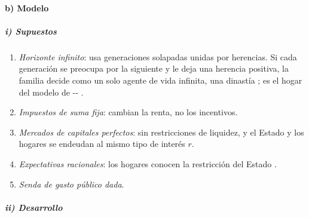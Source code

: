 \documentclass[11pt]{article}
\begin{document}
\paragraph{b) Modelo}

\subparagraph{i) Supuestos}

\begin{enumerate}
\item \emph{Horizonte infinito}:  usa generaciones solapadas unidas por herencias. Si cada generación se preocupa por la siguiente y le deja una herencia positiva, la familia decide como un solo agente de vida infinita, una dinastía ; es el hogar del modelo de -- .
\item \emph{Impuestos de suma fija}: cambian la renta, no los incentivos.
\item \emph{Mercados de capitales perfectos}: sin restricciones de liquidez, y el Estado y los hogares se endeudan al mismo tipo de interés $r$.
\item \emph{Expectativas racionales}: los hogares conocen la restricción del Estado .
\item \emph{Senda de gasto público dada}.
\end{enumerate}

\subparagraph{ii) Desarrollo}
\end{document}
